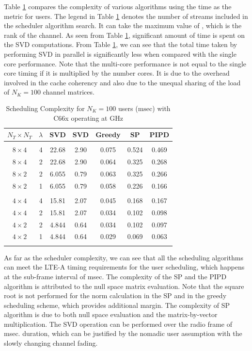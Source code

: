 \documentclass[conference,letterpaper]{./../../IEEE/IEEEtran}
\begin{document}
Table \ref{table:compexity_comparison} compares the complexity of various algorithms using the time as the metric for  users. The legend \me{\lambda} in Table \ref{table:compexity_comparison} denotes the number of streams included in the scheduler algorithm search. It can take the maximum value of \me{\kappa}, which is the rank of the channel. As seen from Table \ref{table:compexity_comparison}, significant amount of time is spent on the SVD computations. From Table \ref{table:compexity_comparison}, we can see that the total time taken by performing SVD in parallel is significantly less when compared with the single core performance. Note that the multi-core performance is not equal to the single core timing if it is multiplied by the number cores. It is due to the overhead involved in the cache coherency and also due to the unequal sharing of the load of $N_K = 100$ channel matrices.
\begin{table} \caption{Scheduling Complexity for $N_K = 100$ users ($\mathrm{msec}$) with C66x operating at GHz} \begin{center} \begin{tabular}{c c c c c c c}
			$N_T \times N_T $ & $\lambda$ & SVD \eqn{(1)} & SVD \eqn{(8)} & Greedy   & SP          & PIPD \\ 
			\hline \\
			$8 \times 4$ & 4 & 22.68 & 2.90 & 0.075 & 0.524 & 0.469 \\ 
			$8 \times 4$ & 2 & 22.68 & 2.90 & 0.064 & 0.325 & 0.268 \\
			$8 \times 2$ & 2 & 6.055 & 0.79 & 0.063 & 0.325 & 0.266 \\
			$8 \times 2$ & 1 & 6.055 & 0.79 & 0.058 & 0.226 & 0.166 \\
			\hline \\
			$4 \times 4$ & 4 & 15.81 & 2.07 & 0.045 & 0.168 & 0.167 \\ 
			$4 \times 4$ & 2 & 15.81 & 2.07 & 0.034 & 0.102 & 0.098 \\
			$4 \times 2$ & 2 & 4.844 & 0.64 & 0.034 & 0.102 & 0.097 \\
			$4 \times 2$ & 1 & 4.844 & 0.64 & 0.029 & 0.069 & 0.063 \\
			\hline \vspace{-0.3in}
		\end{tabular} \label{table:compexity_comparison}\end{center}
\end{table}

As far as the scheduler complexity, we can see that all the scheduling algorithms can meet the LTE-A timing requirements for the user scheduling, which happens at the sub-frame interval of  msec. The complexity of the SP and the PIPD algorithm is attributed to the null space matrix evaluation. Note that the square root is not performed for the norm calculation in the SP and in the greedy scheduling scheme, which provides additional margin. The complexity of SP algorithm is due to both null space evaluation and the matrix-by-vector multiplication. The SVD operation can be performed over the radio frame of  msec. duration, which can be justified by the nomadic user assumption with the slowly changing channel fading.
\end{document}
